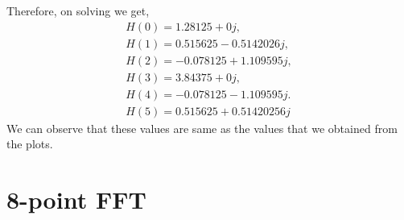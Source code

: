 \documentclass[journal,12pt,twocolumn]{IEEEtran}
\renewcommand\thesection{\arabic{section}}
\begin{document}
\begin{enumerate}[label=\thesection.\arabic*.,ref=\thesection.\theenumi]
Therefore, on solving we get,
\begin{align}
    H(0) = 1.28125 + 0j,\\
    H(1) = 0.515625 - 0.5142026j,\\
    H(2) = -0.078125 + 1.109595j,\\
    H(3) = 3.84375 + 0j,\\
    H(4) = -0.078125 - 1.109595j.\\
    H(5) = 0.515625 + 0.51420256j
\end{align}
We can observe that these values are same as the values that we obtained from the plots.

\end{enumerate}



\section {{8-point FFT}}
\end{document}
